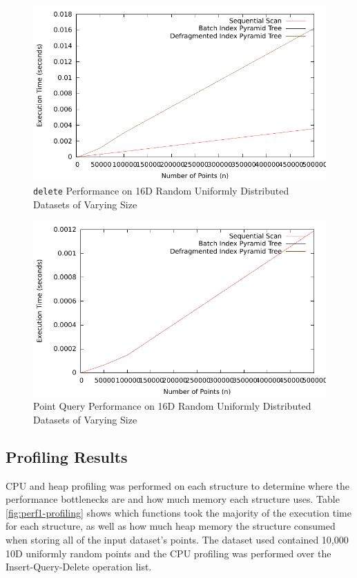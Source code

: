 \begin{figure}
	\centering
	\includegraphics[scale=0.8]{figures/performance_analysis/iteration_1/all_delete_sizevary_average.pdf}
	\caption{\texttt{delete} Performance on 16D Random Uniformly Distributed Datasets of Varying Size}
	\label{fig:perf1-alldelete-n}
\end{figure}

\begin{figure}
	\centering
	\includegraphics[scale=0.8]{figures/performance_analysis/iteration_1/all_pquery_sizevary_average.pdf}
	\caption{Point Query Performance on 16D Random Uniformly Distributed Datasets of Varying Size}
	\label{fig:perf1-allpquery-n}
\end{figure}

\subsection{Profiling Results}

CPU and heap profiling was performed on each structure to determine where the performance bottlenecks are and how much memory each structure uses. Table \ref{fig:perf1-profiling} shows which functions took the majority of the execution time for each structure, as well as how much heap memory the structure consumed when storing all of the input dataset's points. The dataset used contained 10,000 10D uniformly random points and the CPU profiling was performed over the Insert-Query-Delete operation list.

